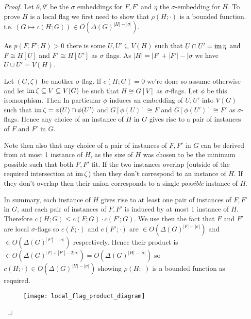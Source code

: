 \begin{proof}
    Let $\theta,\theta'$ be the $\sigma$ embeddings for $F, F'$ and $\eta$ the
    $\sigma$-embedding for $H.$
    To prove $H$ is a local flag we first need to show that $\rho(H; \cdot)$ is a bounded function.
    i.e. $(G \mapsto c(H; G)) \in O(\Delta(G)^{|H|-|\sigma|}).$

    As $p(F, F'; H) > 0$ there is some $U, U'\subseteq V(H)$ such that $U\cap U'=\operatorname{im}\eta$ and
    $F \cong H[U]$ and $F'\cong H[U']$ as $\sigma$ flags. As $|H|=|F|+|F'|-|\sigma$ we
    have $U \cup U' = V(H)$.

    Let $(G, \zeta)$ be another $\sigma$-flag. If $c(H; G) = 0$ we're done so assume otherwise and
    let $\operatorname{im}\zeta \subseteq V\subseteq V(G)$ be such that $H \cong G[V]$ as $\sigma$-flags. Let
    $\phi$ be this isomorphism. Then In particular $\phi$ induces an embedding of $U, U'$ into
    $V(G)$ such that $\operatorname{im}\zeta = \phi(U) \cap \phi(U')$ and $G[\phi(U)] \cong F$ and $G[\phi(U')]
    \cong F'$ as $\sigma$-flags.  Hence any choice of an instance of $H$ in $G$
    gives rise to a pair of instances of $F$ and $F'$ in $G.$

    Note then also that any choice of a pair of instances of $F, F'$ in $G$ can be derived from at
    most 1 instance of $H$, as the size of $H$ was chosen to be the minimum possible such that both
    $F,F'$ fit. If the two instances overlap (outside of the required intersection at $\operatorname{im}\zeta$)
    then they don't correspond to an instance of $H.$ If they don't overlap then their
    union corresponds to a single \textit{possible} instance of $H$.

    In summary, each instance of $H$ gives rise to at least one pair of
    instances of $F, F'$ in $G$, and each pair of instances of $F, F'$ is induced by at most
    1 instance of $H.$
    Therefore $c(H; G) \leq c(F; G)\cdot c(F'; G)$. We use then
    the fact that $F$ and $F'$ are local $\sigma$-flags so $c(F; \cdot)$ and
    $c(F'; \cdot)$ are $\in O(\Delta(G)^{|F|-|\sigma|})$ and $\in O(\Delta(G)^{|F'|-|\sigma|})$
    respectively. Hence their product is
    $\in O(\Delta(G)^{|F|+|F'|-2|\sigma|}) = O(\Delta(G)^{|H|-|\sigma|})$ so
    $c(H; \cdot) \in O(\Delta(G)^{|H|-|\sigma|})$ showing $\rho(H; \cdot)$ is a bounded function as
    required.

    \begin{figure}[!ht]
        \centering
        \texttt{[image: local\_flag\_product\_diagram]}
    \end{figure}


\end{proof}
